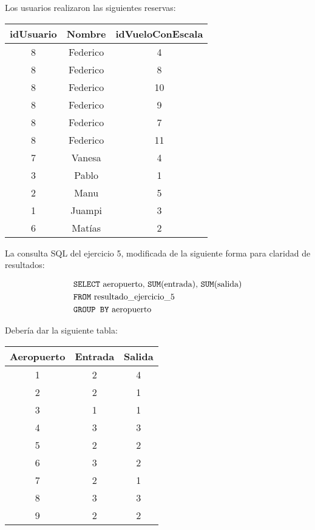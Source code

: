 Los usuarios realizaron las siguientes reservas:
\begin{center}
	\begin{tabular}{ c | c | c }
	\textbf{idUsuario} & \textbf{Nombre} & \textbf{idVueloConEscala} \\ \hline
		8 & Federico & 4 \\
		8 & Federico & 8 \\
		8 & Federico & 10 \\
		8 & Federico & 9 \\
		8 & Federico & 7 \\
		8 & Federico & 11 \\
		7 & Vanesa & 4 \\
		3 & Pablo & 1 \\
		2 & Manu & 5 \\
		1 & Juampi & 3 \\
		6 & Matías & 2 \\
	\end{tabular}
\end{center}

La consulta SQL del ejercicio 5, modificada de la siguiente forma para claridad de resultados:

\begin{align*}
	& \text{\texttt{SELECT} aeropuerto, \texttt{SUM}(entrada), \texttt{SUM}(salida)} \\
	& \text{\texttt{FROM} resultado\_ejercicio\_5} \\
	& \text{\texttt{GROUP BY} aeropuerto} \\
\end{align*}

Debería dar la siguiente tabla:
\begin{center}
	\begin{tabular}{ c | c | c}
		\textbf{Aeropuerto} & \textbf{Entrada} & \textbf{Salida} \\ \hline
		1 & 2 & 4 \\
		2 & 2 & 1 \\
		3 & 1 & 1 \\
		4 & 3 & 3 \\
		5 & 2 & 2 \\
		6 & 3 & 2 \\
		7 & 2 & 1 \\
		8 & 3 & 3 \\
		9 & 2 & 2 \\
	\end{tabular}
\end{center}
